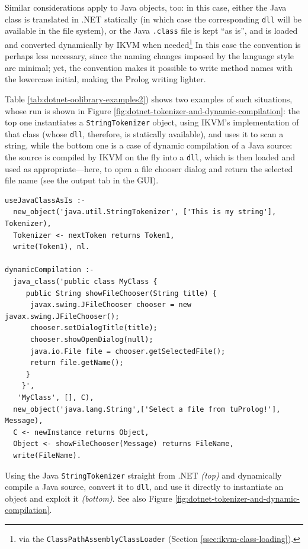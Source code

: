 Similar considerations apply to Java objects, too: in this case, either the Java class is translated in .NET statically (in which case the corresponding \texttt{dll} will be available in the file system), or the Java \texttt{.class} file is kept ``as is'', and is loaded and converted dynamically by IKVM when needed\footnote{via the \texttt{ClassPathAssemblyClassLoader} (Section \ref{ssec:ikvm-class-loading}).}
In this case the convention is perhaps less necessary, since the naming changes imposed by the language style are minimal; yet, the convention makes it possible to write method names with the lowercase initial, making the Prolog writing lighter.

Table \ref{tab:dotnet-oolibrary-examples2}) shows two examples of such situations, whose run is shown in Figure \ref{fig:dotnet-tokenizer-and-dynamic-compilation}: the top one instantiates a \texttt{StringTokenizer} object, using IKVM's implementation of that class (whose \texttt{dll}, therefore, is statically available), and uses it to scan a string, while the bottom one is a case of dynamic compilation of a Java source: the source is compiled by IKVM on the fly into a \texttt{dll}, which is then loaded and used as appropriate---here, to open a file chooser dialog and return the selected file name (see the output tab in the GUI).

\begin{table}
{\footnotesize
\begin{verbatim}
useJavaClassAsIs :-
  new_object('java.util.StringTokenizer', ['This is my string'], Tokenizer),
  Tokenizer <- nextToken returns Token1,
  write(Token1), nl.

dynamicCompilation :-	
  java_class('public class MyClass {
     public String showFileChooser(String title) {
      javax.swing.JFileChooser chooser = new javax.swing.JFileChooser();
      chooser.setDialogTitle(title);
      chooser.showOpenDialog(null);
      java.io.File file = chooser.getSelectedFile();
      return file.getName();
     }
    }',
   'MyClass', [], C),
  new_object('java.lang.String',['Select a file from tuProlog!'], Message),
  C <- newInstance returns Object,
  Object <- showFileChooser(Message) returns FileName,
  write(FileName).
\end{verbatim}
}
  \caption{Using the Java \texttt{StringTokenizer} straight from \tuprolog{}.NET \textit{(top)} and dynamically compile a Java source, convert it to \texttt{dll}, and use it directly to instantiate an object and exploit it \textit{(bottom)}. See also Figure \ref{fig:dotnet-tokenizer-and-dynamic-compilation}.}
  \label{tab:dotnet-oolibrary-examples2}
\end{table}


